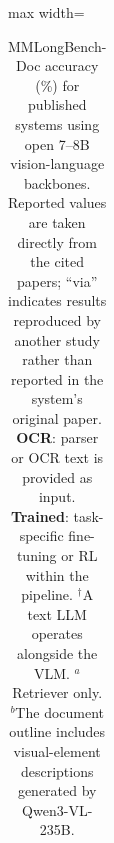 \begin{table}[!h]
\begin{adjustbox}{max width=\textwidth}
\begin{tabular}{lcc ccccc ccc c}
\bottomrule
\end{tabular}
\end{adjustbox}
\caption[Performance of our system against published systems on MMLongBench-Doc]{MMLongBench-Doc accuracy (\%) for published systems using open 7--8B vision-language backbones. Reported values are taken directly from the cited papers; ``via'' indicates results reproduced by another study rather than reported in the system's original paper. \textbf{OCR}: parser or OCR text is provided as input. \textbf{Trained}: task-specific fine-tuning or RL within the pipeline. $^{\dagger}$A text LLM operates alongside the VLM. $^{a}$Retriever only. $^{b}$The document outline includes visual-element descriptions generated by Qwen3-VL-235B.}
\label{tab:mmlongbench_method_comparison_v2}
\end{table}